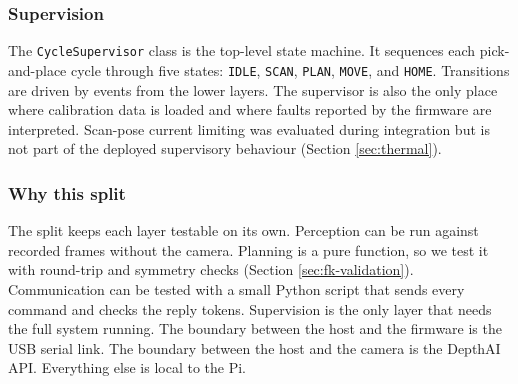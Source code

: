 \subsubsection*{Supervision}
The \texttt{CycleSupervisor} class is the top-level state machine.
It sequences each pick-and-place cycle through five states:
\texttt{IDLE}, \texttt{SCAN}, \texttt{PLAN}, \texttt{MOVE}, and \texttt{HOME}. Transitions are driven by events from the lower layers.
The supervisor is also the only place where calibration data is loaded
and where faults reported by the firmware are interpreted. Scan-pose
current limiting was evaluated during integration but is not part of
the deployed supervisory behaviour (Section \ref{sec:thermal}).
\subsubsection*{Why this split}
The split keeps each layer testable on its own. Perception can be run
against recorded frames without the camera. Planning is a pure
function, so we test it with round-trip and symmetry checks
(Section \ref{sec:fk-validation}). Communication can be tested with a
small Python script that sends every command and checks the reply
tokens. Supervision is the only layer that needs the full system
running.
The boundary between the host and the firmware is the USB serial
link. The boundary between the host and the camera is the DepthAI
API. Everything else is local to the Pi.
